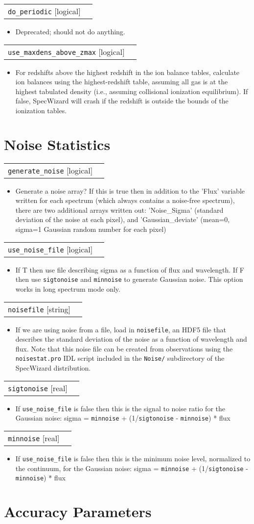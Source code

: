 \documentclass{report}
\makeatletter
\newcommand{\paramdefinition}[3]{
\begin{tabular*}{\textwidth}{l@{\extracolsep{\fill}}r}
		{\tt #1} [{\sc #2}]& #3 \\
\end{tabular*}}
\newcommand{\paramdescription}[1]{
\begin{itemize}
\item #1
\end{itemize}\vspace{0.2cm}}
\makeatother
\begin{document}
\paramdefinition{do\_periodic}{logical}{}
\paramdescription{Deprecated; should not do anything.}

\paramdefinition{use\_maxdens\_above\_zmax}{logical}{}
\paramdescription{For redshifts above the highest redshift in the ion balance tables, calculate ion balances using the highest-redshift table, assuming all gas is at the highest tabulated density (i.e., assuming collisional ionization equilibrium). If false, SpecWizard will crash if the redshift is outside the bounds of the ionization tables.}


\section{Noise Statistics}

\paramdefinition{generate\_noise}{logical}{}
\paramdescription{Generate a noise array?  If this is true then in addition to the 'Flux' variable written for each spectrum (which always contains a noise-free spectrum), there are two additional arrays written out: 'Noise\_Sigma' (standard deviation of the noise at each pixel), and 'Gaussian\_deviate' (mean=0, sigma=1 Gaussian random number for each pixel)}

\paramdefinition{use\_noise\_file}{logical}{}
\paramdescription{If T then use file describing sigma as a function of flux and wavelength.  If F then use {\tt sigtonoise} and {\tt minnoise} to generate Gaussian noise.  This option works in long spectrum mode only.}

\paramdefinition{noisefile}{string}{}
\paramdescription{If we are using noise from a file, load in {\tt noisefile}, an HDF5 file that describes the standard deviation of the noise as a function of wavelength and flux.  Note that this noise file can be created from observations using the {\tt noisestat.pro} IDL script included in the {\tt Noise/} subdirectory of the SpecWizard distribution.}

\paramdefinition{sigtonoise}{real}{}
\paramdescription{If {\tt use\_noise\_file} is false then this is the signal to noise ratio for the Gaussian noise: sigma = {\tt minnoise} + (1/{\tt sigtonoise} - {\tt minnoise}) * flux}

\paramdefinition{minnoise}{real}{}
\paramdescription{If {\tt use\_noise\_file} is false then this is the minimum noise level, normalized to the continuum, for the Gaussian noise: sigma = {\tt minnoise} + (1/{\tt sigtonoise} - {\tt minnoise}) * flux}

\section{Accuracy Parameters}
\end{document}
